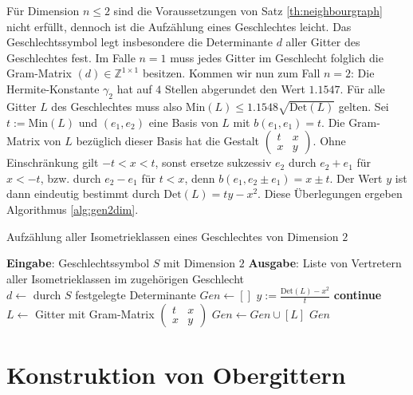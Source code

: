 \documentclass[12pt,a4paper,halfparskip,headsepline,bibtotocnumbered]{scrreprt}
\theoremstyle{nummermitklammern}
\theoremstyle{nonumberbreak}
\newcommand{\Z}{\mathbb{Z}}
\newcommand{\Det}{\text{Det}}
\newcommand{\Min}{\text{Min}}
\begin{document}
Für Dimension $n \leq 2$ sind die Voraussetzungen von Satz \eqref{th:neighbourgraph} nicht erfüllt, dennoch ist die Aufzählung eines Geschlechtes leicht. Das Geschlechtssymbol legt insbesondere die Determinante $d$ aller Gitter des Geschlechtes fest. Im Falle $n = 1$ muss jedes Gitter im Geschlecht folglich die Gram-Matrix $(d) \in \Z^{1 \times 1}$ besitzen. Kommen wir nun zum Fall $n = 2$: Die Hermite-Konstante $\gamma_2$ hat auf $4$ Stellen abgerundet den Wert $1.1547$. Für alle Gitter $L$ des Geschlechtes muss also $\Min(L) \leq 1.1548 \sqrt{\Det(L)}$ gelten. Sei $t := \Min(L)$ und $(e_1, e_2)$ eine Basis von $L$ mit $b(e_1, e_1) = t$. Die Gram-Matrix von $L$ bezüglich dieser Basis hat die Gestalt $\left(\begin{matrix} t & x\\x & y\end{matrix}\right)$. Ohne Einschränkung gilt $-t < x < t$, sonst ersetze sukzessiv $e_2$ durch $e_2 + e_1$ für $x < -t$, bzw. durch $e_2 - e_1$ für $t < x$, denn $b(e_1, e_2 \pm e_1) = x \pm t$. Der Wert $y$ ist dann eindeutig bestimmt durch $\Det(L) =  ty - x^2$. Diese Überlegungen ergeben Algorithmus \eqref{alg:gen2dim}.

\begin{algorithm}
	\caption{Aufzählung aller Isometrieklassen eines Geschlechtes von Dimension $2$}\label{alg:gen2dim}
	\begin{algorithmic}[1]
		\State \textbf{Eingabe}: Geschlechtssymbol $S$ mit Dimension $2$
		\State \textbf{Ausgabe}: Liste von Vertretern aller Isometrieklassen im zugehörigen Geschlecht
		\\
		\State $d \gets$ durch $S$ festgelegte Determinante
		\State $Gen \gets []$
				\State $y := \frac{\Det(L)-x^2}{t}$
				\If {$y \not \in \Z$}
					\State \textbf{continue}
				\EndIf
				\State $L \gets$ Gitter mit Gram-Matrix $\left(\begin{matrix} t & x\\x & y\end{matrix}\right)$
					\State $Gen \gets Gen \cup [L]$
				\EndIf
			\EndFor
		\EndFor
		\State \Return $Gen$
	\end{algorithmic}
\end{algorithm}


\section{Konstruktion von Obergittern}
\end{document}
